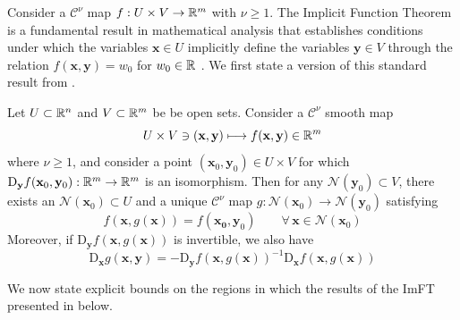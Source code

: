 \documentclass[letterpaper, 10 pt, conference, dvipsnames]{ieeeconf}
\begin{document}
Consider a \(\mathcal{C}^{\nu}\) map \(f: U \times V \to \R[m]\) with \(\nu \geq 1\).
The {Implicit Function Theorem} is a fundamental result in mathematical analysis that establishes conditions under which the variables \(\mathbf{x} \in U\) implicitly define the variables \(\mathbf{y} \in V\) through the relation \(f(\mathbf{x},\mathbf{y}) = w_0\) for \(w_0 \in \R\) \cite{krantz2002implicit}. We first state a version of this standard result from \cite[Theorem 4.B]{zeidler2013vol1}.

 \label{thm:ImFT} Let \(U\subset\R[n]\) and \(V\subset\R[m]\) be be open sets. Consider a \(\mathcal{C}^{\nu}\) smooth map
\begin{equation}
    U\times V\ni(\mathbf{x},\mathbf{y})\mapsto f(\mathbf{x},\mathbf{y})\in\R[m] \label{eq:imftmap}
\end{equation}
where \(\nu\geq1\), {and consider} a point \((\mathbf{x}_0,\mathbf{y}_0)\in U\times V\) for which \(\mathrm{D}_{\mathbf{y}}f(\mathbf{x}_0,\mathbf{y}_0):\R[m]\to\R[m]\) is an isomorphism. Then for any \({\mathcal{N}}(\mathbf{y}_0)\subset V\), there exists an \({\mathcal{N}}(\mathbf{x}_0)\subset U\) and a {unique} \(\mathcal{C}^{\nu}\) map \(g:{\mathcal{N}}(\mathbf{x}_0)\to{\mathcal{N}}(\mathbf{y}_0)\) satisfying
\begin{equation}
    f(\mathbf{x},g(\mathbf{x})) = f(\mathbf{x_0},\mathbf{y}_0)\qquad\forall\,\mathbf{x}\in{\mathcal{N}}(\mathbf{x}_0) \label{eq:imft}
\end{equation}
{Moreover, if \(\mathrm{D}_{\mathbf{y}}f(\mathbf{x},g(\mathbf{x}))\) is invertible, we also have
\vspace{-1.5mm}\begin{equation}
    \mathrm{D}_{\mathbf{x}}g(\mathbf{x},\mathbf{y})=-\mathrm{D}_{\mathbf{y}}f(\mathbf{x},g(\mathbf{x}))^{-1}\mathrm{D}_{\mathbf{x}}f(\mathbf{x},g(\mathbf{x}))
\end{equation}\vspace{-5.5mm}}

We now state explicit bounds on the regions in which the results of the ImFT presented in \cite[Corollary 3.8]{jindal2023imft} below.
\end{document}
